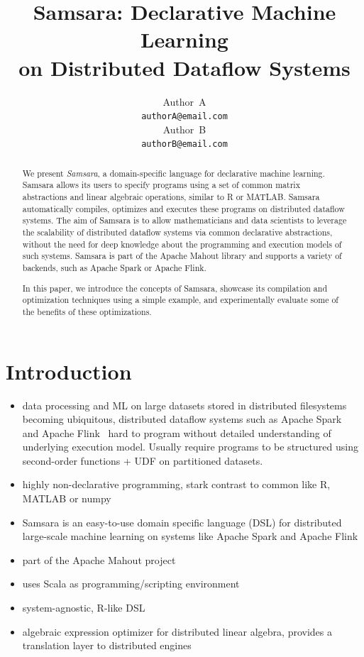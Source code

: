 \documentclass{article}
\title{Samsara: Declarative Machine Learning\\ on Distributed Dataflow Systems}
\author{
  Author~A\\
  \texttt{authorA@email.com} \\
  \And
  Author~B\\
  \texttt{authorB@email.com} \\
}
\begin{document}

\maketitle

\begin{abstract}
  We present {\em Samsara}, a domain-specific language for declarative machine learning. Samsara allows its users to specify programs using a set of common matrix abstractions and linear algebraic operations, similar to R or MATLAB. Samsara automatically compiles, optimizes and executes these programs on distributed dataflow systems. The aim of Samsara is to allow mathematicians and data scientists to leverage the scalability of distributed dataflow systems via common declarative abstractions, without the need for deep knowledge about the programming and execution models of such systems. Samsara is part of the Apache Mahout library and supports a variety of backends, such as Apache Spark or Apache Flink. 

  In this paper, we introduce the concepts of Samsara, showcase its compilation and optimization techniques using a simple example, and experimentally evaluate some of the benefits of these optimizations.
\end{abstract}

\section{Introduction}

\begin{itemize}[noitemsep]
  \item data processing and ML on large datasets stored in distributed filesystems becoming ubiquitous, distributed dataflow systems such as Apache Spark~\cite{Zaharia2012} and Apache Flink~\cite{Alexandrov2014} hard to program without detailed understanding of underlying execution model. Usually require programs to be structured using second-order functions + UDF on partitioned datasets.
  \item highly non-declarative programming, stark contrast to common like R, MATLAB or numpy
\end{itemize}

\begin{itemize}[noitemsep]  
  \item Samsara is an easy-to-use domain specific language (DSL) for distributed large-scale machine learning on systems like Apache Spark and Apache Flink
  \item part of the Apache Mahout project
  \item uses Scala as programming/scripting environment
  \item system-agnostic, R-like DSL
  \item algebraic expression optimizer for distributed linear algebra, provides a translation layer to distributed engines
\end{itemize}
\end{document}

